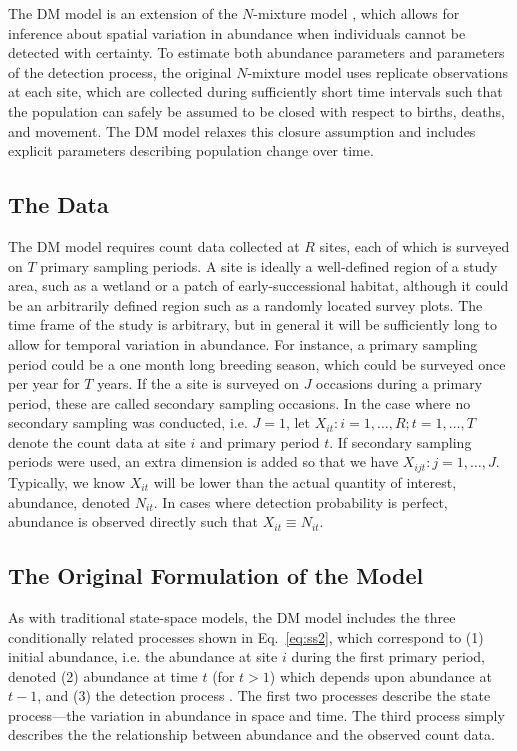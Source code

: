 \documentclass[12pt]{article}
\begin{document}
The DM model is an extension of the $N$-mixture model
\citep{royle:2004biom}, which allows for inference about spatial
variation in abundance when individuals cannot be detected with
certainty. To estimate both abundance parameters and parameters
of the detection process, the original $N$-mixture model uses replicate
observations at each site, which are collected during sufficiently
short time intervals such that the population can safely be
assumed to be closed with respect to births, deaths, and movement. The DM
model relaxes this closure assumption and includes explicit parameters
describing population change over time.


\subsection{The Data}

The DM model requires count data collected at $R$ sites, each of
which is surveyed on $T$ primary sampling periods. A site is ideally a
well-defined region of a study area, such as a wetland or a
patch of early-successional habitat, although it could be an arbitrarily
defined region such as a randomly located survey plots. The time
frame of the study is arbitrary, but in general
it will be sufficiently long to allow for temporal variation in
abundance. For instance, a primary sampling period could be a
one month long breeding season, which could be surveyed once per
year for $T$ years. If the a site is surveyed on $J$ occasions during a
primary period, these are called secondary sampling occasions.
In the case where no secondary sampling was conducted, i.e.
$J=1$, let $X_{it}: i=1,\hdots,R; t=1,\hdots,T$ denote the count data
at site $i$ and primary period $t$. If secondary sampling periods were
used, an extra dimension is added so that we have $X_{ijt}:
j=1,\hdots,J$. Typically, we know $X_{it}$ will be lower than the
actual quantity of interest, abundance,
denoted $N_{it}$. In cases where detection probability is perfect,
abundance is observed directly such that $X_{it} \equiv N_{it}$.

\subsection{The Original Formulation of the Model}

As with traditional state-space models, the DM model includes the
three conditionally related processes shown in Eq.~\ref{eq:ss2},
which correspond to (1) initial abundance, i.e. the
abundance at site $i$ during the first primary period,
denoted (2) abundance at time $t$ (for $t>1$) which depends upon
abundance at $t-1$, and (3) the
detection process \citep{dail_madsen:2011}.
The first two processes describe the state process---the
variation in abundance in space and time. The third process
simply describes the the relationship between
abundance and the observed count data.
\end{document}
